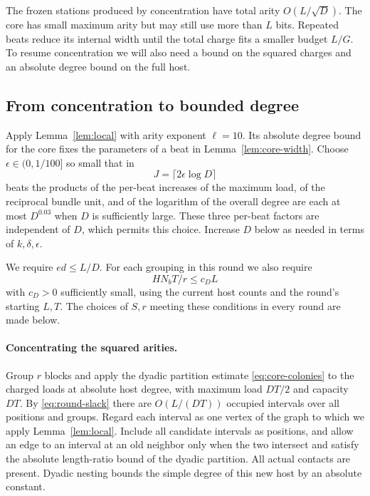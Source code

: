 The frozen stations produced by concentration have total arity
$O(L/\sqrt D)$. The core has small maximum arity but may still use more
than $L$ bits. Repeated beats reduce its internal width until the total
charge fits a smaller budget $L/G$. To resume concentration we will
also need a bound on the squared charges and an absolute degree bound
on the full host.

\subsection{From concentration to bounded degree}
Apply Lemma~\ref{lem:local} with arity exponent $\ell=10$. Its absolute degree bound for the core fixes the parameters of a beat in Lemma~\ref{lem:core-width}. Choose
$\epsilon\in(0,1/100]$ so small that in
\[
 J=\lceil2\epsilon\log D\rceil
\]
beats the products of the per-beat increases of the maximum load, of the
reciprocal bundle unit, and of the logarithm of the overall degree are
each at most $D^{0.03}$ when $D$ is sufficiently large. These three
per-beat factors are independent of $D$, which permits this choice.
Increase $D$ below as needed in terms of $k,\delta,\epsilon$.

We require $ed\le L/D$. For each grouping in this round we also require
\begin{equation}\label{eq:round-slack}
  H N_b T/r\le c_D L
\end{equation}
with $c_D>0$ sufficiently small, using the current host counts and the
round's starting $L,T$. The choices of $S,r$ meeting these conditions
in every round are made below.

\paragraph{Concentrating the squared arities.}
Group $r$ blocks and apply the dyadic partition estimate
\eqref{eq:core-colonies} to the charged loads at absolute host degree,
with maximum load $DT/2$ and capacity $DT$. By
\eqref{eq:round-slack} there are $O(L/(DT))$ occupied intervals over
all positions and groups. Regard each interval as one vertex of the graph
to which we apply Lemma~\ref{lem:local}. Include all candidate intervals
as positions, and allow an edge to an interval at an old neighbor only
when the two intersect and satisfy the absolute length-ratio bound of the
dyadic partition. All actual contacts are present. Dyadic nesting bounds
the simple degree of this new host by an absolute constant.

